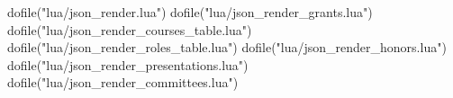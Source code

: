 
\usepackage{luacode}

\begin{luacode*}
dofile("lua/json_render.lua")
dofile("lua/json_render_grants.lua")
dofile("lua/json_render_courses_table.lua")
dofile("lua/json_render_roles_table.lua")
dofile("lua/json_render_honors.lua")
dofile("lua/json_render_presentations.lua")
dofile("lua/json_render_committees.lua")
\end{luacode*}






\newcommand{\luaimportjson}[1]{%
  \directlua{render_json("#1")}%
}

\newcommand{\luaimportjsonkeyword}[2]{%
  \directlua{render_json("#1", "#2")}%
}

\newcommand{\luaimportgrants}[1]{%
  \directlua{render_grants("#1")}%
}

\newcommand{\luaimportcourses}[1]{%
  \directlua{render_courses_table("#1")}%
}

\newcommand{\luaimportroles}[1]{%
  \directlua{render_roles_table("#1")}%
}

\newcommand{\luaimportrolesfiltered}[2]{%
  \leavevmode\directlua{render_roles_table_filtered("#1", "#2")}%
}



\newcommand{\luaimporthonors}[1]{%
  \leavevmode%
  \directlua{render_honors("#1")}%
}

\newcommand{\luaimportselectedpresentations}[1]{%
  \leavevmode\directlua{render_selected_presentations("#1")}%
}

\newcommand{\luaimportallpresentations}[1]{%
  \leavevmode\directlua{render_all_presentations("#1")}%
}

\newcommand{\luaimportcommittees}[1]{%
  \leavevmode\directlua{render_graduate_committees("#1")}%
}

\newcommand{\luaimportgroupedpresentations}[1]{%
  \leavevmode\directlua{render_selected_presentations_grouped("#1")}%
}




\let\importjson\luaimportjson
\let\importjsonkeyword\luaimportjsonkeyword
\let\importgrants\luaimportgrants
\let\importcourses\luaimportcourses
\let\importroles\luaimportroles
\let\importrolesfiltered\luaimportrolesfiltered
\let\importhonors\luaimporthonors
\let\importselectedpresentations\luaimportselectedpresentations
\let\importallpresentations\luaimportallpresentations
\let\importcommittees\luaimportcommittees
\let\importgroupedpresentations\luaimportgroupedpresentations
